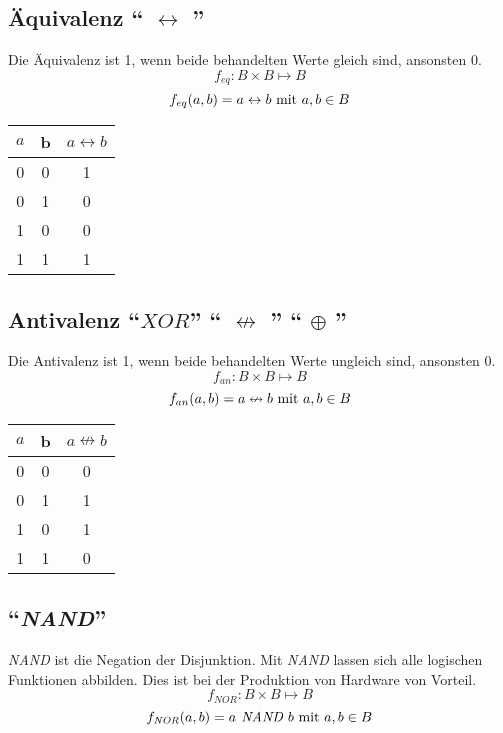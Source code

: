 \subsection{Äquivalenz "` $\leftrightarrow$ "'}
Die Äquivalenz ist 1, wenn beide behandelten Werte gleich sind, ansonsten 0.
$$ f_{eq}: B \times B \mapsto B $$
$$ f_{eq}(a, b) = a \leftrightarrow b \textnormal{ mit } a, b \in B$$

\begin{center}
\begin{tabular}{ccc}
	$a$ & b & $a \leftrightarrow b$ \\ \hline
	 0  & 0 &    1    \\
	 0  & 1 &    0    \\
	 1  & 0 &    0    \\
	 1  & 1 &    1    \\
\end{tabular}
\end{center}

\subsection{Antivalenz "`$XOR$"' "` $\nleftrightarrow$ "' "` $\oplus$ "'}
Die Antivalenz ist 1, wenn beide behandelten Werte ungleich sind, ansonsten 0.
$$ f_{an}: B \times B \mapsto B $$
$$ f_{an}(a, b) = a \nleftrightarrow b \textnormal{ mit } a, b \in B$$

\begin{center}
\begin{tabular}{ccc}
	$a$ & b & $a \nleftrightarrow b$ \\ \hline
	 0  & 0 &    0    \\
	 0  & 1 &    1    \\
	 1  & 0 &    1    \\
	 1  & 1 &    0    \\
\end{tabular}
\end{center}

\subsection{"`\textit{NAND}"'}
\textit{NAND} ist die Negation der Disjunktion. Mit \textit{NAND} lassen sich alle logischen Funktionen abbilden. Dies ist bei der Produktion von Hardware von Vorteil. 
$$ f_{\textit{NOR}}: B \times B \mapsto B $$
$$ f_{\textit{NOR}}(a, b) = a \textit{ NAND } b \textnormal{ mit } a, b \in B$$

